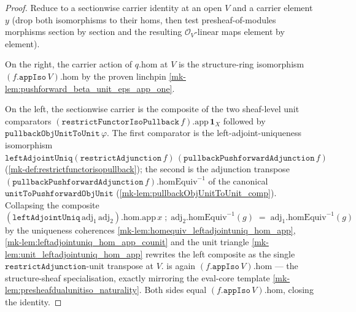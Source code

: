 \begin{proof}
  \leanok
  Reduce to a sectionwise carrier identity at an open \(V\) and a carrier element \(y\) (drop both
  isomorphisms to their homs, then test presheaf-of-modules morphisms section by section and the
  resulting \(\mathcal{O}_V\)-linear maps element by element).

  On the right, the carrier action of \(q.\mathrm{hom}\) at \(V\) is the structure-ring isomorphism
  \((f.\mathtt{appIso}\,V).\mathrm{hom}\) by the proven linchpin
  \ref{mk-lem:pushforward_beta_unit_eps_app_one}.

  On the left, the sectionwise carrier is the composite of the two sheaf-level unit comparators
  \((\mathtt{restrictFunctorIsoPullback}\,f).\mathrm{app}\,\mathbf 1_X\) followed by
  \(\mathtt{pullbackObjUnitToUnit}\,\varphi\). The first comparator is the left-adjoint-uniqueness
  isomorphism \(\mathtt{leftAdjointUniq}(\mathtt{restrictAdjunction}\,f)\,
  (\mathtt{pullbackPushforwardAdjunction}\,f)\) (\ref{mk-def:restrictfunctorisopullback}); the second is
  the adjunction transpose \((\mathtt{pullbackPushforwardAdjunction}\,f).\mathrm{homEquiv}^{-1}\) of
  the canonical \(\mathtt{unitToPushforwardObjUnit}\) (\ref{mk-lem:pullbackObjUnitToUnit_comp}).
  Collapsing the composite
  \[
    (\mathtt{leftAdjointUniq}\,\mathrm{adj}_1\,\mathrm{adj}_2).\mathrm{hom}.\mathrm{app}\,x
      \;\mathbin{;}\; \mathrm{adj}_2.\mathrm{homEquiv}^{-1}(g)
      \;=\; \mathrm{adj}_1.\mathrm{homEquiv}^{-1}(g)
  \]
  by the uniqueness coherences \ref{mk-lem:homequiv_leftadjointuniq_hom_app},
  \ref{mk-lem:leftadjointuniq_hom_app_counit} and the unit triangle
  \ref{mk-lem:unit_leftadjointuniq_hom_app} rewrites the left composite as the single
  \(\mathtt{restrictAdjunction}\)-unit transpose at \(V\).
  is again \((f.\mathtt{appIso}\,V).\mathrm{hom}\) --- the structure-sheaf specialisation, exactly
  mirroring the eval-core template \ref{mk-lem:presheafdualunitiso_naturality}. Both sides equal
  \((f.\mathtt{appIso}\,V).\mathrm{hom}\), closing the identity.
\end{proof}

